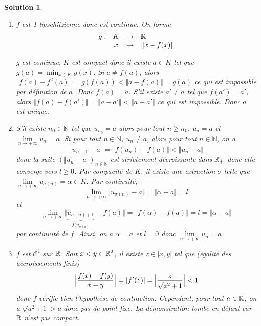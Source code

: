 \documentclass[12pt]{article}
\newtheorem{solution}{Solution}[section]
\theoremstyle{remark}
\newcommand{\N}{\mathbb{N}} \newcommand{\Z}{\mathbb{Z}}
\newcommand{\function}[5]{
	$$
	\begin{array}{rccl}
		#1: & #2 & \to & #3 \\
		& #4 & \mapsto & #5
	\end{array}
	$$
}
\numberwithin{equation}{section}
\begin{document}
\begin{solution}
	\phantom{}
	\begin{enumerate}
		\item $f$ est 1-lipschitzienne donc est continue. On forme \function{g}{K}{\R}{x}{\Vert x-f(x)\Vert}
		$g$ est continue, $K$ est compact donc il existe $a\in K$ tel que $g(a)=\min_{x\in K}g(x)$. Si $a\neq f(a)$, alors $\Vert f(a)-f^{2}(a)\Vert=g(f(a))<\Vert a-f(a)\Vert=g(a)$ ce qui est impossible par définition de $a$. Donc $f(a)=a$. S'il existe $a'\neq a$ tel que $f(a')=a'$, alors $\Vert f(a)-f(a')\Vert=\Vert a-a'\Vert<\Vert a-a'\Vert$ ce qui est impossible. Donc $a$ est unique.

		\item S'il existe $n_{0}\in\N$ tel que $u_{n_{0}}=a$ alors pour tout $n\geqslant n_{0}$, $u_{n}=a$ et $\lim\limits_{n\to+\infty}u_{n}=a$. Si pour tout $n\in\N$, $u_{n}\neq a$, alors pour tout $n\in\N$, on a
		$$\Vert u_{n+1}-a\Vert=\Vert f(u_{n})-f(a)\Vert<\Vert u_{n}-a\Vert$$
		donc la suite $(\Vert u_{n}-a\Vert)_{n\in\N}$ est strictement décroissante dans $\mathbb{R}_{+}$ donc elle converge vers $l\geqslant0$. Par compacité de $K$, il existe une extraction $\sigma$ telle que $\lim\limits_{n\to+\infty}u_{\sigma(n)}=\alpha\in K$. Par continuité, $$\lim\limits_{n\to+\infty}\Vert u_{\sigma(n)}-a\Vert=\Vert\alpha-a\Vert=l$$ 
		et
		$$\lim\limits_{n\to+\infty}\Vert \underbrace{u_{\sigma(n)+1}}_{f(u_{\sigma(n)}}-f(a)\Vert=\Vert f(\alpha)-f(a)\Vert=l=\Vert\alpha-a\Vert$$
		par continuité de $f$.
		Ainsi, on a $\alpha=a$ et $l=0$ donc $\lim\limits_{n\to+\infty}u_{n}=a$.

		\item $f$ est $\mathcal{C}^{1}$ sur $\mathbb{R}$. Soit $x<y\in\mathbb{R}^{2}$, il existe $z\in]x,y[$ tel que (égalité des accroissements finis)
		$$\Bigl\lvert\frac{f(x)-f(y)}{x-y}\Bigr\rvert=\vert f'(z)\vert=\Bigl\lvert\frac{z}{\sqrt{z^{2}+1}}\Bigr\rvert<1$$
		donc $f$ vérifie bien l'hypothèse de contraction. Cependant, pour tout $a\in\mathbb{R}$, on a $\sqrt{a^{2}+1}>a$ donc pas de point fixe. La démonstration tombe en défaut car $\mathbb{R}$ n'est pas compact.
	\end{enumerate}
\end{solution}
\end{document}
